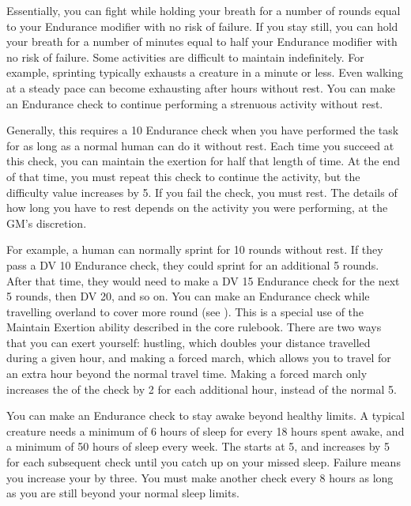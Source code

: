     Essentially, you can fight while holding your breath for a number of rounds equal to your Endurance modifier with no risk of failure.
    If you stay still, you can hold your breath for a number of minutes equal to half your Endurance modifier with no risk of failure.
    Some activities are difficult to maintain indefinitely.
    For example, sprinting typically exhausts a creature in a minute or less.
    Even walking at a steady pace can become exhausting after hours without rest.
    You can make an Endurance check to continue performing a strenuous activity without rest.

    Generally, this requires a  10 Endurance check when you have performed the task for as long as a normal human can do it without rest.
    Each time you succeed at this check, you can maintain the exertion for half that length of time.
    At the end of that time, you must repeat this check to continue the activity, but the difficulty value increases by 5.
    If you fail the check, you must rest.
    The details of how long you have to rest depends on the activity you were performing, at the GM's discretion.

    For example, a human can normally sprint for 10 rounds without rest.
    If they pass a DV 10 Endurance check, they could sprint for an additional 5 rounds.
    After that time, they would need to make a DV 15 Endurance check for the next 5 rounds, then DV 20, and so on.
     You can make an Endurance check while travelling overland to cover more round (see ).
    This is a special use of the Maintain Exertion ability described in the core rulebook.
    There are two ways that you can exert yourself: hustling, which doubles your distance travelled during a given hour, and making a forced march, which allows you to travel for an extra hour beyond the normal travel time.
    Making a forced march only increases the  of the check by 2 for each additional hour, instead of the normal 5.

     You can make an Endurance check to stay awake beyond healthy limits.
    A typical creature needs a minimum of 6 hours of sleep for every 18 hours spent awake, and a minimum of 50 hours of sleep every week.
    The  starts at 5, and increases by 5 for each subsequent check until you catch up on your missed sleep.
    Failure means you increase your  by three.
    You must make another check every 8 hours as long as you are still beyond your normal sleep limits.

